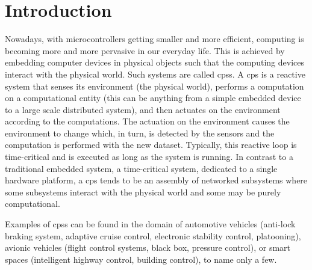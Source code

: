 %
\chapter{Introduction}
\label{chap_intro}
Nowadays, with microcontrollers getting smaller and more efficient, computing is becoming more and more pervasive in our everyday life.
This is achieved by embedding computer devices in physical objects such that the computing devices interact with the physical world.
Such systems are called \glspl{cps}.
A \gls{cps} is a reactive system that senses its environment (the physical world), performs a computation on a computational entity (this can be anything from a simple embedded device to a large scale distributed system), and then actuates on the environment according to the computations.
The actuation on the environment causes the environment to change which, in turn, is detected by the sensors and the computation is performed with the new dataset.
Typically, this reactive loop is time-critical and is executed as long as the system is running.
In contrast to a traditional embedded system, \ie a time-critical system, dedicated to a single hardware platform, a \gls{cps} tends to be an assembly of networked subsystems where some subsystems interact with the physical world and some may be purely computational.

Examples of \glspl{cps} can be found in the domain of automotive vehicles (\eg anti-lock braking system, adaptive cruise control, electronic stability control, platooning), avionic vehicles (\eg flight control systems, black box, pressure control), or smart spaces (\eg intelligent highway control, building control), to name only a few.

